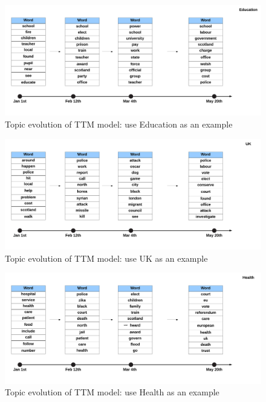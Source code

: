 \begin{figure}[h]
\centering
\includegraphics[width=1\textwidth]{figures/ttm_education_tc.png}
\caption{Topic evolution of TTM model: use Education as an example}
\label{fig:ttm_education_tc}
\end{figure}
\begin{figure}[h]
\centering
\includegraphics[width=1\textwidth]{figures/ttm_uk_tc.png}
\caption{Topic evolution of TTM model: use UK as an example}
\label{fig:ttm_uk_tc}
\end{figure}
\begin{figure}[h]
\centering
\includegraphics[width=1\textwidth]{figures/ttm_health_tc.png}
\caption{Topic evolution of TTM model: use Health as an example}
\label{fig:ttm_health_tc}
\end{figure}

